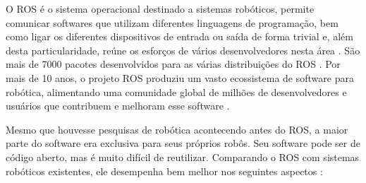 O ROS é o sistema operacional destinado a sistemas robóticos, permite comunicar softwares que utilizam diferentes linguagens de programação, bem como ligar os diferentes dispositivos de entrada ou saída de forma trivial e, além desta particularidade, reúne os esforços de vários desenvolvedores nesta área \cite{quigley2015programming}. São mais de 7000 pacotes desenvolvidos para as várias distribuições do ROS \cite{ROSindex}. Por mais de 10 anos, o projeto ROS produziu um vasto ecossistema de software para robótica, alimentando uma comunidade global de milhões de desenvolvedores e usuários que contribuem e melhoram esse software \cite{WhyRos}.

Mesmo que houvesse pesquisas de robótica acontecendo antes do ROS, a maior parte do software era exclusiva para seus próprios robôs. Seu software pode ser de código aberto, mas é muito difícil de reutilizar. Comparando o ROS com sistemas robóticos existentes, ele desempenha bem melhor nos seguintes aspectos \cite{joseph2017ros}:


